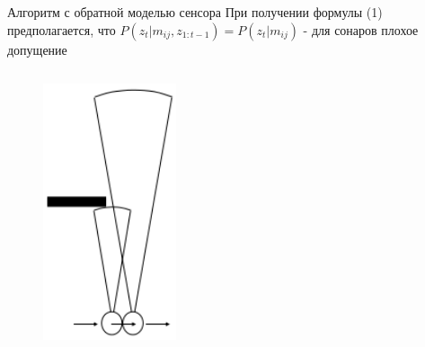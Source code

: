 \documentclass[9pt]{beamer}
\begin{document}
\begin{frame}{Алгоритм с обратной моделью сенсора}
При получении формулы (1) предполагается, что
$P(z_t|m_{ij}, z_{1:t-1}) = P(z_t|m_{ij})$ - для сонаров плохое допущение

\begin{columns}
\begin{column}{0.33\textwidth}
  \begin{figure}[h]
    \centering
    \includegraphics[width=0.65\textwidth]{inv1.png}
  \end{figure}
\end{column}
\begin{column}{0.33\textwidth}
\begin{figure}[h]
    \centering

\end{figure}
\end{column}
\end{columns}
\end{frame}
\end{document}
